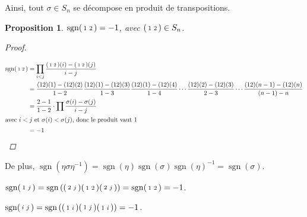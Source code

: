 \documentclass{report}
\newcommand*{\signe}{\operatorname{sgn}}
\newtheorem*{prop}{Proposition}
\theoremstyle{definition}
\theoremstyle{remark}
\begin{document}
	Ainsi, tout $\sigma \in S_n$ se d\'ecompose en produit de transpositions.
	\begin{prop}
		$\signe\begin{psmallmatrix}
			1&2
		\end{psmallmatrix} = -1$, avec $\begin{psmallmatrix}
			1&2
		\end{psmallmatrix} \in S_n$.
		\begin{proof}~

			\begin{align*}
				\signe\begin{psmallmatrix}
					1&2
				\end{psmallmatrix}&= \prod_{i < j} \dfrac{\begin{psmallmatrix}
						1&2
					\end{psmallmatrix}(i) - \begin{psmallmatrix}
						1&2
				\end{psmallmatrix}(j)}{i-j}\\
			&= \dfrac{(12)(1) - (12)(2)}{1-2} \dfrac{(12)(1) - (12)(3)}{1-3} \dfrac{(12)(1) - (12)(4)}{1-4} \dotsb \dfrac{(12)(2) - (12)(3)}{2-3} \dotsb \dfrac{(12)(n-1) - (12)(n)}{(n-1)-n}\\
			&= \dfrac{2-1}{1-2} \cdot \prod \dfrac{\sigma(i) - \sigma(j)}{i-j}\\
			\intertext{avec $i<j$ et $\sigma(i)<\sigma(j)$, donc le produit vaut $1$}
			&= -1
			\end{align*}
		\end{proof}
	\end{prop}

	De plus, $\signe(\eta\sigma\eta^{-1}) = \signe(\eta) \signe(\sigma) \signe(\eta)^{-1} = \signe(\sigma)$.

	$\signe\begin{psmallmatrix}
		1&j
	\end{psmallmatrix} = \signe \left(\begin{psmallmatrix}
		2&j
	\end{psmallmatrix} \begin{psmallmatrix}
		1&2
	\end{psmallmatrix} \begin{psmallmatrix}
		2&j
	\end{psmallmatrix} \right) = \signe\begin{psmallmatrix}
		1&2
	\end{psmallmatrix} = -1$.

	$\signe\begin{psmallmatrix}
		i&j
	\end{psmallmatrix} = \signe \left( \begin{psmallmatrix}
		1&i
	\end{psmallmatrix} \begin{psmallmatrix}
		1&j
	\end{psmallmatrix} \begin{psmallmatrix}
		1&i
	\end{psmallmatrix} \right) = -1$.
\end{document}
